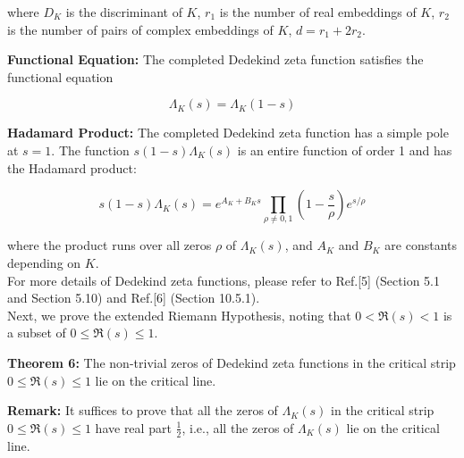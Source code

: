 \documentclass[12pt]{article}
\begin{document}
where $D_K$ is the discriminant of $K$, $r_1$ is the number of real embeddings of $K$, $r_2$ is the number of pairs of complex embeddings of $K$, $d=r_1+2r_2$.


\textbf{Functional Equation:}
The completed Dedekind zeta function satisfies the functional equation

\begin{equation}\Lambda_K(s) = \Lambda_K(1-s)\end{equation}


\textbf{Hadamard Product:}
The completed Dedekind zeta function has a simple pole at $s = 1$. The function $s(1-s)\Lambda_K(s)$ is an entire function of order 1 and has the Hadamard product:

\begin{equation}s(1-s)\Lambda_K(s)= e^{A_K + B_K s} \prod_{\rho \neq 0, 1} \left(1 - \frac{s}{\rho}\right) e^{s/\rho}\end{equation}

where the product runs over all zeros $\rho$ of $\Lambda_K(s)$, and $A_K$ and $B_K$ are constants depending on $K$.\\

For more details of Dedekind zeta functions, please refer to Ref.[5] (Section 5.1 and Section 5.10) and Ref.[6] (Section 10.5.1).  \\

Next, we prove the extended Riemann Hypothesis, noting that $0 < \Re(s) < 1$ is a subset of $0 \leq \Re(s) \leq 1$.

\textbf{Theorem 6:} The non-trivial zeros of Dedekind zeta functions in the critical strip $0 \leq \Re(s) \leq 1$ lie on the critical line.

\textbf{Remark:} It suffices to prove that all the zeros of $\Lambda_K(s)$ in the critical strip $0 \leq \Re(s) \leq 1$ have real part $\frac{1}{2}$, i.e., all the zeros of $\Lambda_K(s)$ lie on the critical line.
\end{document}
